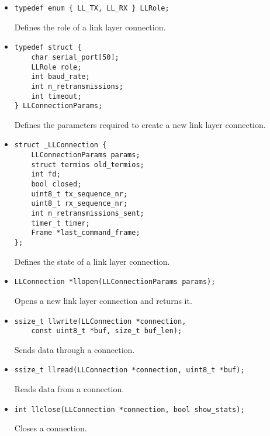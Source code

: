 \documentclass[11pt,a4paper]{article}
\begin{document}
\begin{itemize}
    \item \begin{lstlisting}
typedef enum { LL_TX, LL_RX } LLRole;
    \end{lstlisting}

    Defines the role of a link layer connection.

    \item \begin{lstlisting}
typedef struct {
    char serial_port[50];
    LLRole role;
    int baud_rate;
    int n_retransmissions;
    int timeout;
} LLConnectionParams;
    \end{lstlisting}

    Defines the parameters required to create a new link layer connection.

    \item \begin{lstlisting}
struct _LLConnection {
    LLConnectionParams params;
    struct termios old_termios;
    int fd;
    bool closed;
    uint8_t tx_sequence_nr;
    uint8_t rx_sequence_nr;
    int n_retransmissions_sent;
    timer_t timer;
    Frame *last_command_frame;
};
    \end{lstlisting}

    Defines the state of a link layer connection.

    \item \begin{lstlisting}
LLConnection *llopen(LLConnectionParams params);
    \end{lstlisting}

    Opens a new link layer connection and returns it.

    \item \begin{lstlisting}
ssize_t llwrite(LLConnection *connection,
    const uint8_t *buf, size_t buf_len);
    \end{lstlisting}

    Sends data through a connection.

    \item \begin{lstlisting}
ssize_t llread(LLConnection *connection, uint8_t *buf);
    \end{lstlisting}

    Reads data from a connection.

    \item \begin{lstlisting}
int llclose(LLConnection *connection, bool show_stats);
    \end{lstlisting}

    Closes a connection.
\end{itemize}
\end{document}
